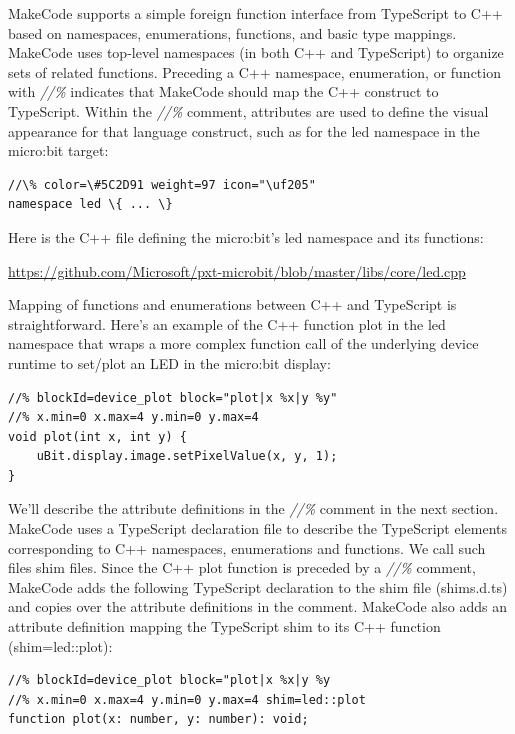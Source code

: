 MakeCode supports a simple foreign function interface from TypeScript to C++ based on namespaces,
enumerations, functions, and basic type mappings. MakeCode uses top-level namespaces (in both C++ and
TypeScript) to organize sets of related functions.  Preceding a C++ namespace, enumeration, or function
with \emph{//\%} indicates that MakeCode should map the C++ construct to TypeScript. 
Within the \emph{//\%} comment, attributes are used to define the visual appearance for that
language construct, such as for the led namespace in the micro:bit target:

\begin{lstlisting}
//\% color=\#5C2D91 weight=97 icon="\uf205"
namespace led \{ ... \}
\end{lstlisting}    	 

Here is the C++ file defining the micro:bit's led namespace and its functions:
\begin{center}
\url{https://github.com/Microsoft/pxt-microbit/blob/master/libs/core/led.cpp}
\end{center}

Mapping of functions and enumerations between C++ and TypeScript is straightforward. 
Here's an example of the C++ function plot in the led namespace that wraps a more
complex function call of the underlying device runtime to set/plot an LED in the micro:bit display:

\begin{lstlisting}
//% blockId=device_plot block="plot|x %x|y %y"
//% x.min=0 x.max=4 y.min=0 y.max=4
void plot(int x, int y) {
    uBit.display.image.setPixelValue(x, y, 1);
}
\end{lstlisting}

We'll describe the attribute definitions in the \emph{//\%} comment in the next section. 
MakeCode uses a  TypeScript declaration file to describe the TypeScript elements corresponding
to C++ namespaces, enumerations and functions.  We call such files shim files.
Since the C++ plot function is preceded by a \emph{//\%} comment, 
MakeCode adds the following TypeScript declaration to the shim file (shims.d.ts) and copies
over the attribute definitions in the comment. MakeCode also adds an attribute definition mapping
the TypeScript shim to its C++ function (shim=led::plot):

\begin{lstlisting}
//% blockId=device_plot block="plot|x %x|y %y
//% x.min=0 x.max=4 y.min=0 y.max=4 shim=led::plot
function plot(x: number, y: number): void;
\end{lstlisting}

